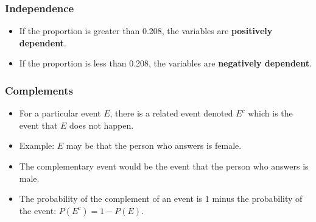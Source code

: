 \begin{frame}
\frametitle{Independence}
\begin{itemize}

\item If the proportion is greater than 0.208, the variables are {\bf
  positively dependent}.

\item If the proportion is less than 0.208, the variables are {\bf
  negatively dependent}.

\end{itemize}

\end{frame}
%
%
%
%
%
%

\begin{frame}
\frametitle{Complements}

\begin{itemize}

\item For a particular event $E$, there is a related event denoted $E^c$
which is the event that $E$ does not happen.

\item Example: $E$ may be that the person who answers is female.  
\item The complementary
event would be the event that the person who answers is male.

\item The probability of the complement of an event is 1 minus the
probability of the event: $P(E^c) = 1 - P(E)$.
\end{itemize}


\end{frame}


